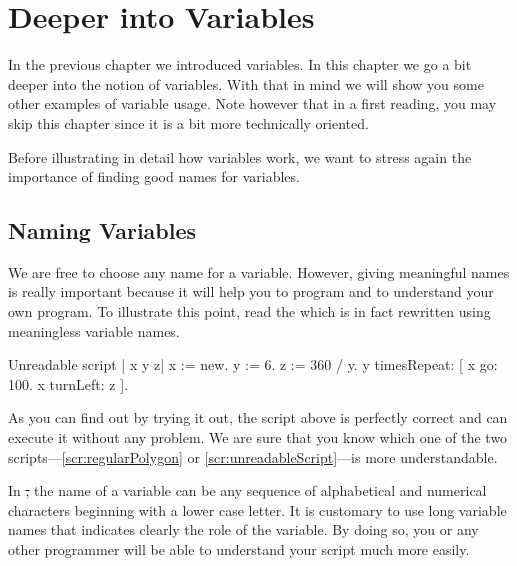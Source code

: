 
\ifx\wholebook\relax\else



\fi

\chapter{Deeper into Variables}\label{ch:furthervariables}

In the previous chapter we introduced variables. In this chapter we go a bit deeper into the notion of variables. With that in mind we will show you some other examples of variable usage. Note however that in a first reading, you may skip this chapter since it is a bit more technically oriented. 

Before illustrating in detail how variables work, we want to stress again the importance of finding good names for variables. 


\section{Naming Variables}\label{sec:variableNames} 

We are free to choose any name for a variable. However, giving meaningful names is really important because it will help you to program and to understand your own program. To illustrate this point, read the  which is in fact  rewritten using meaningless variable names.

\begin{scriptwithtitle}{Unreadable script}
\label{scr:unreadableScript}
| x y z|
x := \Turtle new.
y := 6.
z := 360 / y.
y timesRepeat: 
      [ x go: 100.
      x turnLeft: z ].
\end{scriptwithtitle}

As you can find out by trying it out, the script above is perfectly correct and \sq can execute it without any problem. We are sure that you know which one of the two
scripts---\ref{scr:regularPolygon} or \ref{scr:unreadableScript}---is
more understandable.

In \st, the name of a variable can be any sequence of alphabetical and
numerical characters beginning with a lower case letter. It is customary to use long variable names that indicates clearly the role of the variable. By doing so, you or any other programmer will be able to understand your script much more easily. 

